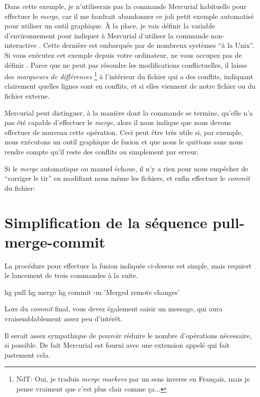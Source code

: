 Dans cette exemple, je n'utiliserais pas la commande Mercurial
habituelle  pour effectuer le \textit{merge},
car il me faudrait abandonner ce joli petit exemple automatisé
pour utiliser un outil graphique. À la place, je vais définir
la variable d'environnement  pour indiquer à 
Mercurial d'utiliser la commande non-interactive .
Cette dernière est embarquée par de nombreux systèmes ``à la Unix''.
Si vous exécutez cet exemple depuis votre ordinateur, ne vous
occupez pas de définir .
Parce que  ne peut pas résoudre les modifications
conflictuelles, il laisse des \emph{marqueurs de différences}
\footnote{NdT: Oui, je traduis \textit{merge markers} par un sens
inverse en Français, mais je pense vraiment que c'est plus clair 
comme ça...} à l'intérieur du fichier qui a des conflits, indiquant
clairement quelles lignes sont en conflits, et si elles viennent de
notre fichier ou du fichier externe.

Mercurial peut distinguer, à la manière dont la commande 
se termine, qu'elle n'a pas été capable d'effectuer le \textit{merge},
alors il nous indique que nous devons effectuer de nouveau cette
opération. Ceci peut être très utile si, par exemple, nous exécutons un
outil graphique de fusion et que nous le quittons sans nous rendre compte
qu'il reste des conflits ou simplement par erreur.

Si le \textit{merge} automatique ou manuel échoue, il n'y a rien pour
nous empêcher de ``corriger le tir'' en modifiant nous même les fichiers,
et enfin effectuer le \textit{commit} du fichier:

\section{Simplification de la séquence pull-merge-commit}
\label{sec:tour-merge:fetch}

La procédure pour effectuer la fusion indiquée ci-dessus est simple,
mais requiert le lancement de trois commandes à la suite.
\begin{codesample2}
  hg pull
  hg merge
  hg commit -m 'Merged remote changes'
\end{codesample2}

Lors du \textit{commit} final, vous devez également saisir un message,
qui aura vraisemblablement assez peu d'intérêt.

Il serait assez sympathique de pouvoir réduire le nombre d'opérations
nécessaire, si possible. De fait Mercurial est fourni avec une
extension appelé  qui fait justement cela.


